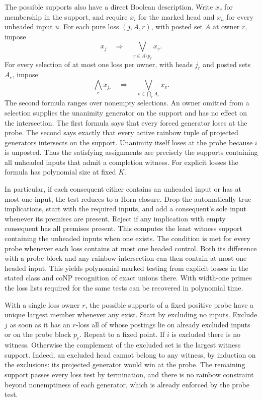 The possible supports also have a direct Boolean description.
Write $x_v$ for membership in the support, and require $x_i$
for the marked head and $x_u$ for every unheaded input $u$.
For each pure loss $(j,A,r)$, with posted set $A$ at owner $r$,
impose
\[
 x_j\quad\Longrightarrow\quad \bigvee_{v\in A\setminus p_r}x_v .
\]
For every selection of at most one loss per owner, with
heads $j_r$ and posted sets $A_r$, impose
\[
 \bigwedge_r x_{j_r}\quad\Longrightarrow\quad
     \bigvee_{v\in\bigcap_r A_r}x_v .
\]
The second formula ranges over nonempty selections. An owner
omitted from a selection supplies the unanimity generator
on the support and has no effect on the intersection. The
first formula says that every forced generator loses at the
probe. The second says exactly that every active rainbow
tuple of projected generators intersects on the support.
Unanimity itself loses at the probe because $i$ is unposted.
Thus the satisfying assignments are precisely the supports
containing all unheaded inputs that admit a completion
witness. For explicit losses the formula has polynomial
size at fixed $K$.

In particular, if each consequent either contains an unheaded
input or has at most one input, the test reduces to a Horn
closure. Drop the automatically true implications, start with
the required inputs, and add a consequent's sole input
whenever its premises are present. Reject if any implication
with empty consequent has all premises present. This computes
the least witness support containing the unheaded inputs when
one exists. The condition is met for every probe whenever
each loss contains at most one headed control. Both its
difference with a probe block and any rainbow intersection
can then contain at most one headed input. This yields polynomial marked
testing from explicit losses in the stated class and coNP
recognition of exact unions there. With width-one primes
the loss lists required for the same tests can be recovered
in polynomial time.

With a single loss owner $r$, the possible supports of a
fixed positive probe have a unique largest member whenever
any exist. Start by excluding no inputs. Exclude $j$ as soon
as it has an $r$-loss all of whose postings lie on already
excluded inputs or on the probe block $p_r$. Repeat to a
fixed point. If $i$ is excluded there is no witness. Otherwise
the complement of the excluded set is the largest witness
support. Indeed, an excluded head cannot belong to any
witness, by induction on the exclusions: its projected
generator would win at the probe. The remaining support
passes every loss test by termination, and there is no
rainbow constraint beyond nonemptiness of each generator,
which is already enforced by the probe test.


